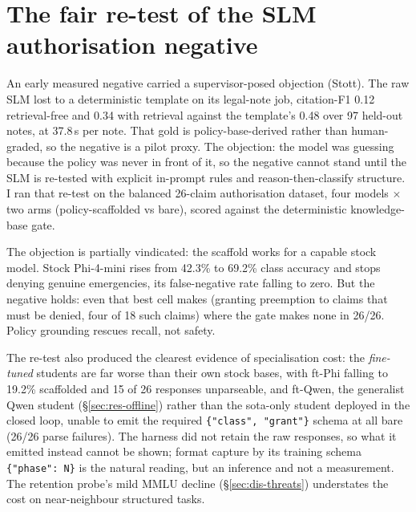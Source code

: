 \section{The fair re-test of the SLM authorisation negative}\label{sec:res-lee}
An early measured negative carried a supervisor-posed objection (Stott).
The raw SLM lost to a deterministic template on its legal-note job,
citation-F1 0.12 retrieval-free and 0.34 with retrieval against the
template's 0.48 over 97 held-out notes, at 37.8\,s per note. That gold is
policy-base-derived rather than human-graded, so the negative is a pilot
proxy. The objection: the model was guessing because the policy was never in front
of it, so the negative cannot stand until the SLM is re-tested with
explicit in-prompt rules and reason-then-classify structure. I ran that re-test
on the balanced 26-claim authorisation dataset, four models $\times$ two
arms (policy-scaffolded vs bare), scored against the deterministic
knowledge-base gate.

The objection is partially vindicated: the scaffold works for a capable
stock model. Stock Phi-4-mini rises from 42.3\% to 69.2\% class accuracy
and stops denying genuine emergencies, its false-negative rate falling
to zero. But the negative holds: even that best cell makes
 (granting preemption to claims that
must be denied, four of 18 such claims) where the gate makes none in
26/26. Policy grounding rescues recall, not safety.

The re-test also produced the clearest evidence of specialisation cost:
the \emph{fine-tuned} students are far worse than their own stock bases,
with ft-Phi falling to 19.2\% scaffolded and 15 of 26 responses
unparseable, and ft-Qwen, the generalist Qwen student
(\S\ref{sec:res-offline}) rather than the sota-only student deployed in
the closed loop, unable to emit the required
\texttt{\{"class", "grant"\}} schema at all bare (26/26 parse failures).
The harness did not retain the raw responses, so what it emitted instead
cannot be shown; format capture by its training schema
\texttt{\{"phase": N\}} is the natural reading, but an inference and not a
measurement. The
retention probe's mild MMLU decline (\S\ref{sec:dis-threats}) understates
the cost on near-neighbour structured tasks.

